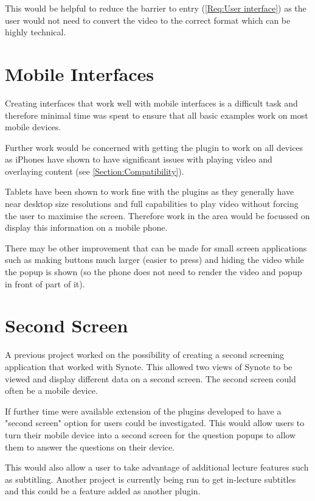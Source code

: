 This would be helpful to reduce the barrier to entry (\cref{Req:User interface}) as the user would not need to convert the video to the correct format which can be highly technical.

\section{Mobile Interfaces}

Creating interfaces that work well with mobile interfaces is a difficult task and therefore minimal time was spent to ensure that all basic examples work on most mobile devices.

Further work would be concerned with getting the plugin to work on all devices as iPhones have shown to have significant issues with playing video and overlaying content (see \autoref{Section:Compatibility}).

Tablets have been shown to work fine with the plugins as they generally have near desktop size resolutions and full capabilities to play video without forcing the user to maximise the screen. Therefore work in the area would be focussed on display this information on a mobile phone.

There may be other improvement that can be made for small screen applications such as making buttons much larger (easier to press) and hiding the video while the popup is shown (so the phone does not need to render the video and popup in front of part of it).

\section{Second Screen}

A previous project  worked on the possibility of creating a second screening application that worked with Synote. This allowed two views of Synote to be viewed and display different data on a second screen. The second screen could often be a mobile device.

If further time were available extension of the plugins developed to have a "second screen" option for users could be investigated. This would allow users to turn their mobile device into a second screen for the question popups to allow them to answer the questions on their device.

This would also allow a user to take advantage of additional lecture features such as subtitling. Another project is currently being run to get in-lecture subtitles and this could be a feature added as another plugin.

